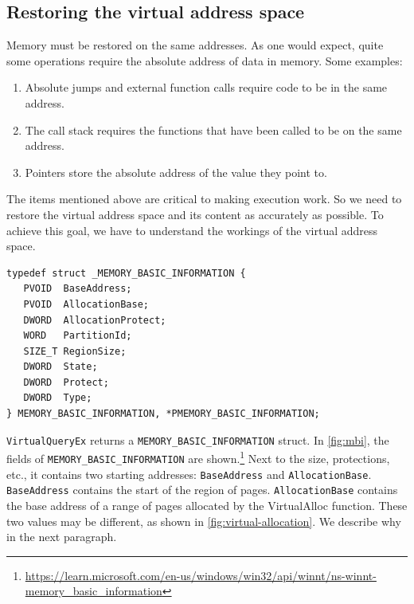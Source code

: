 \documentclass[a4paper, 11pt, english]{report}
\begin{document}
\subsection{Restoring the virtual address space}
\label{sec:memory-tranplanting-vm}
Memory must be restored on the same addresses. As one would expect, quite some operations require the absolute address of data in memory. Some examples:
\begin{enumerate}
	\item Absolute jumps and external function calls require code to be in the same address.
	\item The call stack requires the functions that have been called to be on the same address.
	\item Pointers store the absolute address of the value they point to.
\end{enumerate}
The items mentioned above are critical to making execution work. So we need to restore the virtual address space and its content as accurately as possible. To achieve this goal, we have to understand the workings of the virtual address space.

\begin{lstlisting}[float=h,label=fig:mbi,language={[Visual]C++},caption={Struct of \texttt{MEMORY\_BASIC\_INFORMATION}}]
typedef struct _MEMORY_BASIC_INFORMATION {
   PVOID  BaseAddress;
   PVOID  AllocationBase;
   DWORD  AllocationProtect;
   WORD   PartitionId;
   SIZE_T RegionSize;
   DWORD  State;
   DWORD  Protect;
   DWORD  Type;
} MEMORY_BASIC_INFORMATION, *PMEMORY_BASIC_INFORMATION;
\end{lstlisting}

\texttt{VirtualQueryEx} returns a \texttt{MEMORY\_BASIC\_INFORMATION} struct. In \autoref{fig:mbi}, the fields of \texttt{MEMORY\_BASIC\_INFORMATION} are shown.\footnote{\url{https://learn.microsoft.com/en-us/windows/win32/api/winnt/ns-winnt-memory_basic_information}}
Next to the size, protections, etc., it contains two starting addresses: \texttt{BaseAddress} and \texttt{AllocationBase}. 
\texttt{BaseAddress} contains the start of the region of pages.
\texttt{AllocationBase} contains the base address of a range of pages allocated by the VirtualAlloc function.
These two values may be different, as shown in \autoref{fig:virtual-allocation}. We describe why in the next paragraph.
\end{document}

